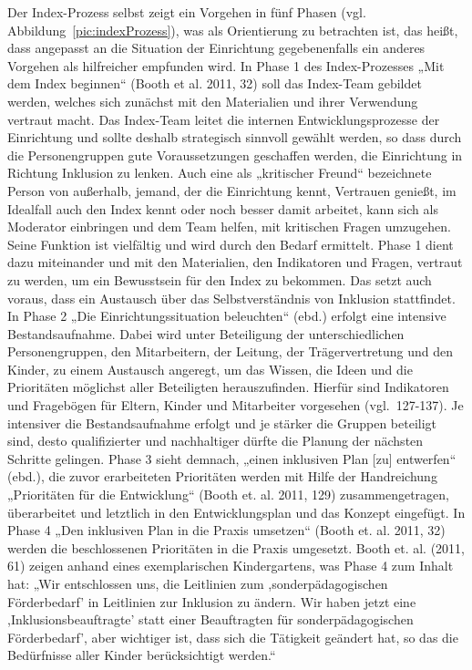Der Index-Prozess selbst zeigt ein Vorgehen in fünf Phasen (vgl. Abbildung~\ref{pic:indexProzess}), was als Orientierung zu betrachten ist, das heißt, dass angepasst an die Situation der Einrichtung gegebenenfalls ein anderes Vorgehen als hilfreicher empfunden wird.  
In Phase 1 des Index-Prozesses „Mit dem Index beginnen“ (Booth et al. 2011, 32) soll das Index-Team gebildet werden, welches sich zunächst mit den Materialien und ihrer Verwendung vertraut macht. Das Index-Team leitet die internen Entwicklungsprozesse der Einrichtung und sollte deshalb strategisch sinnvoll gewählt werden, so dass durch die Personengruppen gute  Voraussetzungen geschaffen werden, die Einrichtung in Richtung Inklusion zu lenken. Auch eine als „kritischer Freund“ bezeichnete Person von außerhalb, jemand, der die Einrichtung kennt, Vertrauen genießt, im Idealfall auch den Index kennt oder noch besser damit arbeitet, kann sich als Moderator einbringen und dem Team helfen, mit kritischen Fragen umzugehen. Seine Funktion ist vielfältig und wird durch den Bedarf ermittelt. Phase 1 dient dazu miteinander und mit den Materialien, den Indikatoren und Fragen, vertraut zu werden, um ein Bewusstsein für den Index zu bekommen. Das setzt auch voraus, dass ein Austausch über das Selbstverständnis von Inklusion stattfindet.  
In Phase 2 „Die Einrichtungssituation beleuchten“ (ebd.) erfolgt eine intensive Bestandsaufnahme. Dabei wird unter Beteiligung der  unterschiedlichen Personengruppen, den Mitarbeitern, der Leitung, der Trägervertretung und den Kinder, zu einem Austausch angeregt, um das Wissen, die Ideen und die Prioritäten möglichst aller Beteiligten herauszufinden. Hierfür sind Indikatoren und Fragebögen für Eltern, Kinder und Mitarbeiter vorgesehen (vgl.~127-137). Je intensiver die Bestandsaufnahme erfolgt und je stärker die Gruppen beteiligt sind, desto qualifizierter und nachhaltiger dürfte die Planung der nächsten Schritte gelingen. 
Phase 3 sieht demnach, „einen inklusiven Plan [zu] entwerfen“ (ebd.), die zuvor erarbeiteten Prioritäten werden mit Hilfe der Handreichung „Prioritäten für die Entwicklung“ (Booth et. al. 2011, 129) zusammengetragen, überarbeitet und letztlich in den Entwicklungsplan und das Konzept eingefügt.
In Phase 4 „Den inklusiven Plan in die Praxis umsetzen“ (Booth et. al. 2011, 32) werden die beschlossenen Prioritäten in die Praxis umgesetzt.  
Booth et. al. (2011, 61) zeigen anhand eines exemplarischen Kindergartens, was Phase 4 zum Inhalt hat: „Wir entschlossen uns, die Leitlinien zum ,sonderpädagogischen Förderbedarf' in Leitlinien zur Inklusion zu ändern. Wir haben jetzt eine ,Inklusionsbeauftragte' statt einer Beauftragten für sonderpädagogischen Förderbedarf', aber wichtiger ist, dass sich die Tätigkeit geändert hat, so das die Bedürfnisse aller Kinder berücksichtigt werden.“   
